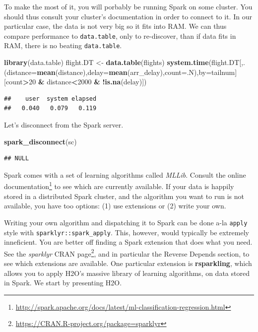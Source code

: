\documentclass[]{book}
\newenvironment{Shaded}{\begin{snugshade}}{\end{snugshade}}
\newcommand{\DataTypeTok}[1]{\textcolor[rgb]{0.13,0.29,0.53}{#1}}
\newcommand{\DecValTok}[1]{\textcolor[rgb]{0.00,0.00,0.81}{#1}}
\newcommand{\KeywordTok}[1]{\textcolor[rgb]{0.13,0.29,0.53}{\textbf{#1}}}
\newcommand{\NormalTok}[1]{#1}
\newcommand{\OperatorTok}[1]{\textcolor[rgb]{0.81,0.36,0.00}{\textbf{#1}}}
\newcommand{\StringTok}[1]{\textcolor[rgb]{0.31,0.60,0.02}{#1}}
\renewcommand{\href}[2]{#2\footnote{\url{#1}}}
\theoremstyle{definition}
\theoremstyle{definition}
\theoremstyle{definition}
\theoremstyle{remark}
\begin{document}
To make the most of it, you will porbably be running Spark on some cluster.
You should thus consult your cluster's documentation in order to connect to it.
In our particular case, the data is not very big so it fits into RAM.
We can thus compare performance to \texttt{data.table}, only to re-discover, than if data fits in RAM, there is no beating \texttt{data.table}.

\begin{Shaded}
\begin{Highlighting}[]
\KeywordTok{library}\NormalTok{(data.table)}
\NormalTok{flight.DT <-}\StringTok{ }\KeywordTok{data.table}\NormalTok{(flights)}
\KeywordTok{system.time}\NormalTok{(flight.DT[,.(}\DataTypeTok{distance=}\KeywordTok{mean}\NormalTok{(distance),}\DataTypeTok{delay=}\KeywordTok{mean}\NormalTok{(arr_delay),}\DataTypeTok{count=}\NormalTok{.N),}\DataTypeTok{by=}\NormalTok{tailnum][count}\OperatorTok{>}\DecValTok{20} \OperatorTok{&}\StringTok{ }\NormalTok{distance}\OperatorTok{<}\DecValTok{2000} \OperatorTok{&}\StringTok{ }\OperatorTok{!}\KeywordTok{is.na}\NormalTok{(delay)])}
\end{Highlighting}
\end{Shaded}

\begin{verbatim}
##    user  system elapsed 
##   0.040   0.079   0.119
\end{verbatim}

Let's disconnect from the Spark server.

\begin{Shaded}
\begin{Highlighting}[]
\KeywordTok{spark_disconnect}\NormalTok{(sc)}
\end{Highlighting}
\end{Shaded}

\begin{verbatim}
## NULL
\end{verbatim}

Spark comes with a set of learning algorithms called \emph{MLLib}.
Consult the \href{http://spark.apache.org/docs/latest/ml-classification-regression.html}{online documentation} to see which are currently available.
If your data is happily stored in a distributed Spark cluster, and the algorithm you want to run is not available, you have too options:
(1) use extensions or (2) write your own.

Writing your own algorithm and dispatching it to Spark can be done a-la \texttt{apply} style with \texttt{sparklyr::spark\_apply}. This, however, would typically be extremely inneficient. You are better off finding a Spark extension that does what you need.
See the \emph{sparklyr} \href{https://CRAN.R-project.org/package=sparklyr}{CRAN page}, and in particular the Reverse Depends section, to see which extensions are available.
One particular extension is \textbf{rsparkling}, which allows you to apply H2O's massive library of learning algorithms, on data stored in Spark.
We start by presenting H2O.
\end{document}
